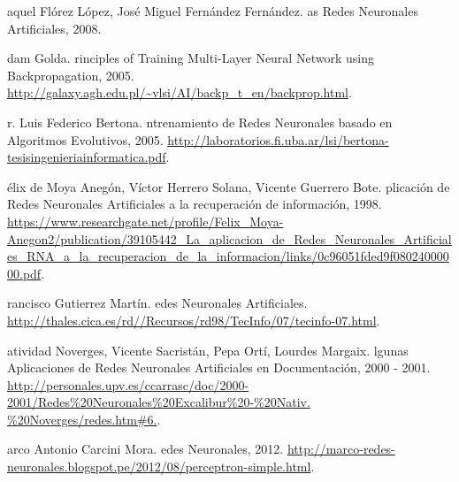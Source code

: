 \documentclass[journal]{IEEEtran}
\begin{document}
\begin{thebibliography}{0}

aquel {F}lórez {L}ópez, {J}osé {M}iguel {F}ernández {F}ernández.
as {R}edes {N}euronales {A}rtificiales, 2008.

dam {G}olda.
rinciples of {T}raining {M}ulti-{L}ayer {N}eural {N}etwork using {B}ackpropagation, 2005.
\url{http://galaxy.agh.edu.pl/~vlsi/AI/backp_t_en/backprop.html}.

r. {L}uis {F}ederico {B}ertona.
ntrenamiento de {R}edes {N}euronales basado en {A}lgoritmos {E}volutivos, 2005. 
\url{http://laboratorios.fi.uba.ar/lsi/bertona-tesisingenieriainformatica.pdf}.

élix de {M}oya {A}negón, {V}íctor {H}errero {S}olana, {V}icente {G}uerrero {B}ote.
plicación de {R}edes {N}euronales {A}rtificiales a la recuperación de información, 1998. 
\url{https://www.researchgate.net/profile/Felix_Moya-Anegon2/publication/39105442_La_aplicacion_de_Redes_Neuronales_Artificiales_RNA_a_la_recuperacion_de_la_informacion/links/0c96051fded9f08024000000.pdf}.

rancisco {G}utierrez {M}artín.
edes {N}euronales {A}rtificiales. 
\url{http://thales.cica.es/rd//Recursos/rd98/TecInfo/07/tecinfo-07.html}.


atividad {N}overges, {V}icente {S}acristán, {P}epa {O}rtí, {L}ourdes {M}argaix.
lgunas {A}plicaciones de {R}edes {N}euronales {A}rtificiales en {D}ocumentación, 2000 - 2001.
\url{http://personales.upv.es/ccarrasc/doc/2000-2001/Redes\%20Neuronales\%20Excalibur\%20-\%20Nativ. \%20Noverges/redes.htm#6.}.

arco {A}ntonio {C}arcini {M}ora.
edes {N}euronales, 2012.
\url{http://marco-redes-neuronales.blogspot.pe/2012/08/perceptron-simple.html}.
\end{thebibliography}
\end{document}
